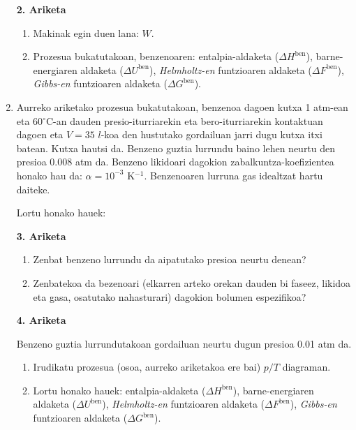 \documentclass[10pt]{article}              %
\begin{document}
\begin{enumerate}
\begin{tcolorbox}[breakable, drop shadow,enhanced,notitle,boxrule=0pt,colback=blue!15,colframe=black!100]
\textbf{2. Ariketa}

\begin{enumerate}
\item Makinak egin duen lana: $W$.
\item Prozesua bukatutakoan, benzenoaren: entalpia-aldaketa ($\Delta H^{\text{ben}}$), barne-energiaren aldaketa ($\Delta U^{\text{ben}}$), \textit{Helmholtz-en} funtzioaren aldaketa ($\Delta F^{\text{ben}}$), \textit{Gibbs-en} funtzioaren aldaketa ($\Delta G^{\text{ben}}$).  

\end{enumerate}


\end{tcolorbox}



\item[]

Aurreko ariketako prozesua bukatutakoan, benzenoa dagoen kutxa 1 atm-ean eta 60$^{\circ}$C-an dauden presio-iturriarekin eta bero-iturriarekin kontaktuan dagoen eta $V=35$ $l$-koa den hustutako gordailuan jarri dugu kutxa itxi batean. Kutxa hautsi da. Benzeno guztia lurrundu baino lehen neurtu den presioa 0.008 atm da. Benzeno likidoari dagokion zabalkuntza-koefizientea honako hau da: $\alpha = 10^{-3}$ K$^{-1}$. Benzenoaren lurruna gas idealtzat hartu daiteke.


Lortu honako hauek:

\vspace{0.25cm}
\textbf{3. Ariketa}

\begin{enumerate}
\item Zenbat benzeno lurrundu da aipatutako presioa neurtu denean?  
\item Zenbatekoa da bezenoari (elkarren arteko orekan dauden bi faseez, likidoa eta gasa, osatutako nahasturari) dagokion bolumen espezifikoa?\\
\end{enumerate}

\textbf{4. Ariketa}

Benzeno guztia lurrundutakoan gordailuan neurtu dugun presioa 0.01 atm da.  

\begin{enumerate}
\item Irudikatu prozesua (osoa, aurreko ariketakoa ere bai) $p/T$ diagraman.
\item Lortu honako hauek: entalpia-aldaketa ($\Delta H^{\text{ben}}$), barne-energiaren aldaketa ($\Delta U^{\text{ben}}$), \textit{Helmholtz-en} funtzioaren aldaketa ($\Delta F^{\text{ben}}$), \textit{Gibbs-en} funtzioaren aldaketa ($\Delta G^{\text{ben}}$).\end{enumerate}




\end{enumerate}
\end{document}
